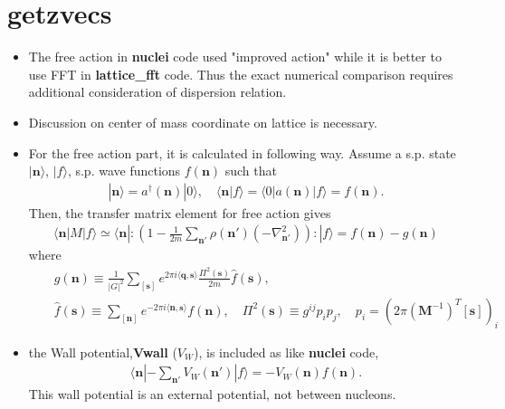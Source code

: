 \documentclass[10pt]{book}
\def\bm{\boldsymbol}
\newcommand{\bea}{\begin{eqnarray}}
\newcommand{\eea}{\end{eqnarray}}
\newcommand{\no}{\nonumber \\}
\def\vn{{\bm n}}
\def\vq{{\bm q}}
\def\la{\langle}
\def\ra{\rangle}
\begin{document}
\section{getzvecs }  
\begin{itemize}
	\item The free action in {\bf nuclei} code used "improved action" 
	while  it is better to use FFT in {\bf lattice\_fft} code. Thus the exact numerical
	comparison requires additional consideration of dispersion relation. 
	\item {\color{red} Discussion on center of mass coordinate on lattice is necessary. } 
                          
    \item For the free action part, it is calculated in following way.
        Assume a s.p. state $|\vn\ra$, $|f\ra$, s.p. wave functions $f(\vn)$
     such that  
      \bea 
         |\vn\ra= a^\dagger(\vn)|0\ra,\quad \la \vn|f\ra=  \la 0| a(\vn)|f\ra= f(\vn).
      \eea 
      Then, the transfer matrix element for free action gives 
      \bea 
      \la \vn|M|f\ra\simeq \la \vn|:\left(1-\frac{1}{2m}\sum_{\vn'} \rho(\vn') (-\nabla^2_{\vn'}) \right):|f\ra 
      = f(\vn)-g(\vn)
      \eea
      where 
      \bea  
      & &g(\vn)\equiv \frac{1}{|G|^2}\sum_{[\bm s]} e^{2\pi i\la \vq,{\bm s}\ra } 
      \frac{\Pi^2({\bm s})}{2m} \hat{f}({\bm s}), \no 
      & & \hat{f}({\bm s})\equiv \sum_{[\vn]} e^{-2\pi i\la \vn,{\bm s}\ra } f(\vn) ,\quad 
      \Pi^2({\bm s}) \equiv  g^{ij} p_{i} p_j,\quad p_i=\left(2\pi ({\bm M}^{-1})^T[{\bm s}] \right)_i 
      \eea 

	\item the Wall potential,{\bf Vwall} ($V_{W}$), is included as like {\bf nuclei} code, 
	      \bea 
	      \la \vn|-\sum_{\vn'} V_W(\vn')|f\ra= - V_W(\vn)f(\vn).  
	      \eea  
          This wall potential is an external potential, not between nucleons.  
	      

\end{itemize}
\end{document}
